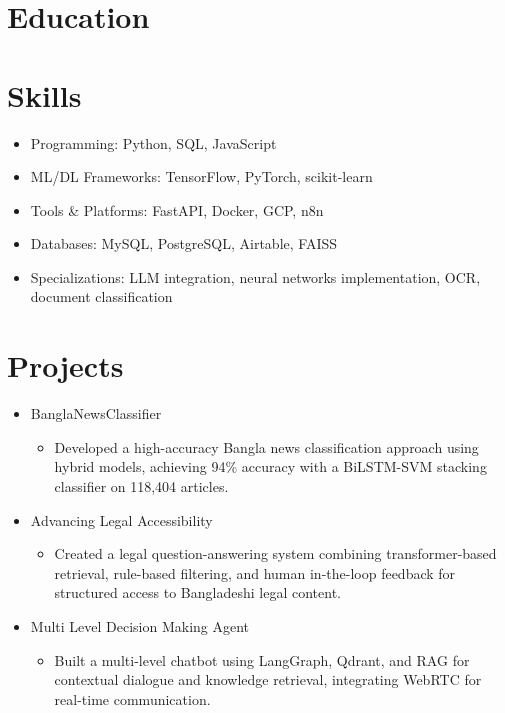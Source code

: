 \documentclass[11pt,a4paper,sans]{moderncv}
\begin{document}
\section{Education}

\section{Skills}
\begin{itemize}
    \item Programming: Python, SQL, JavaScript
    \item ML/DL Frameworks: TensorFlow, PyTorch, scikit-learn
    \item Tools \& Platforms: FastAPI, Docker, GCP, n8n
    \item Databases: MySQL, PostgreSQL, Airtable, FAISS
    \item Specializations: LLM integration, neural networks implementation, OCR, document classification
\end{itemize}

\section{Projects}
\begin{itemize}
    \item BanglaNewsClassifier
    \begin{itemize}
        \item Developed a high-accuracy Bangla news classification approach using hybrid models, achieving 94\% accuracy with a BiLSTM-SVM stacking classifier on 118,404 articles.
    \end{itemize}
    \item Advancing Legal Accessibility
    \begin{itemize}
        \item Created a legal question-answering system combining transformer-based retrieval, rule-based filtering, and human in-the-loop feedback for structured access to Bangladeshi legal content.
    \end{itemize}
    \item Multi Level Decision Making Agent
    \begin{itemize}
        \item Built a multi-level chatbot using LangGraph, Qdrant, and RAG for contextual dialogue and knowledge retrieval, integrating WebRTC for real-time communication.
    \end{itemize}
\end{itemize}
\end{document}
